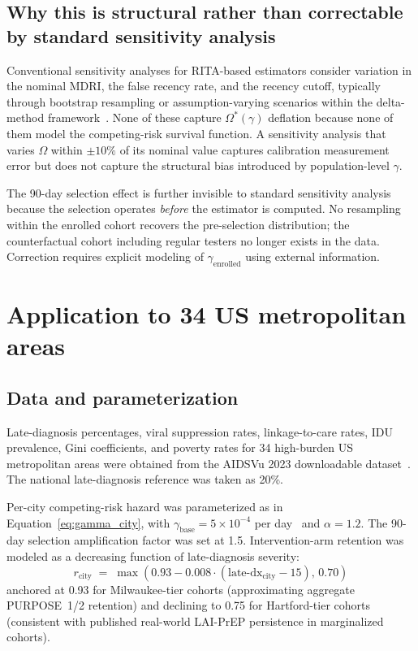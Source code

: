 \documentclass[11pt]{article}
\begin{document}
\subsection{Why this is structural rather than correctable by standard sensitivity analysis}

Conventional sensitivity analyses for RITA-based estimators consider variation in the nominal MDRI, the false recency rate, and the recency cutoff, typically through bootstrap resampling or assumption-varying scenarios within the delta-method framework~\cite{gao2021}. None of these capture $\Omega^*(\gamma)$ deflation because none of them model the competing-risk survival function. A sensitivity analysis that varies $\Omega$ within $\pm 10\%$ of its nominal value captures calibration measurement error but does not capture the structural bias introduced by population-level $\gamma$.

The 90-day selection effect is further invisible to standard sensitivity analysis because the selection operates \emph{before} the estimator is computed. No resampling within the enrolled cohort recovers the pre-selection distribution; the counterfactual cohort including regular testers no longer exists in the data. Correction requires explicit modeling of $\gamma_{\mathrm{enrolled}}$ using external information.

\section{Application to 34 US metropolitan areas}

\subsection{Data and parameterization}

Late-diagnosis percentages, viral suppression rates, linkage-to-care rates, IDU prevalence, Gini coefficients, and poverty rates for 34 high-burden US metropolitan areas were obtained from the AIDSVu 2023 downloadable dataset~\cite{aidsvu2023}. The national late-diagnosis reference was taken as 20\%.

Per-city competing-risk hazard was parameterized as in Equation~\ref{eq:gamma_city}, with $\gamma_{\mathrm{base}} = 5 \times 10^{-4}$ per day~\cite{nhbs2023,cdcatp2023,bjs2023} and $\alpha = 1.2$. The 90-day selection amplification factor was set at 1.5. Intervention-arm retention was modeled as a decreasing function of late-diagnosis severity:
\begin{equation}
r_{\mathrm{city}} \;=\; \max(0.93 - 0.008 \cdot (\text{late-dx}_{\mathrm{city}} - 15),\, 0.70) \label{eq:retention}
\end{equation}
anchored at 0.93 for Milwaukee-tier cohorts (approximating aggregate PURPOSE~1/2 retention) and declining to 0.75 for Hartford-tier cohorts (consistent with published real-world LAI-PrEP persistence in marginalized cohorts).
\end{document}
